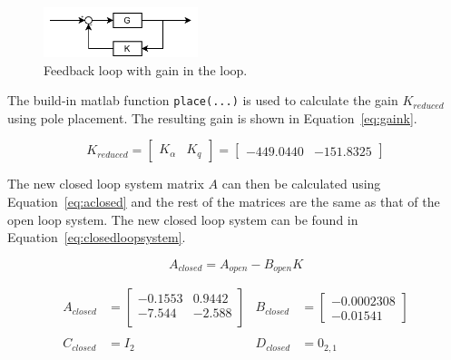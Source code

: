 \begin{figure}[ht]
    \centering
    \includegraphics[width=0.4\textwidth]{figures/pc_loop1.pdf}    
    \caption{Feedback loop with gain in the loop.}
    \label{fig:pc_loop1}
\end{figure}

The build-in matlab function \texttt{place(...)} is used to calculate the gain $K_{reduced}$ using pole placement. The resulting gain is shown in Equation~\ref{eq:gaink}.

\begin{equation}
    \label{eq:gaink}
    K_{reduced}=\begin{bmatrix}
                    K_{\alpha} & K_q
                \end{bmatrix}
               =\begin{bmatrix}
                    -449.0440 & -151.8325
                \end{bmatrix}
\end{equation}

The new closed loop system matrix $A$ can then be calculated using Equation~\ref{eq:aclosed} and the rest of the matrices are the same as that of the open loop system. The new closed loop system can be found in Equation~\ref{eq:closedloopsystem}.

\begin{equation}
    \label{eq:aclosed}
    A_{closed} = A_{open}-B_{open}K
\end{equation}


\begin{equation}
    \label{eq:closedloopsystem}
    \begin{aligned}
        A_{closed}&=\begin{bmatrix}
            -0.1553 &  0.9442 \\
            -7.544  & -2.588 \\
        \end{bmatrix} &
        B_{closed}&=\begin{bmatrix}
            -0.0002308 \\
            -0.01541
        \end{bmatrix} \\\\
        C_{closed}&=I_2 &
        D_{closed}&=0_{2,1}
    \end{aligned}
\end{equation}

